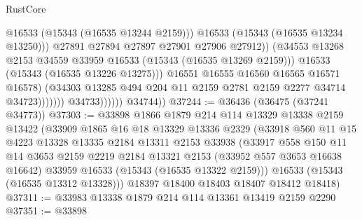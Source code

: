 \begin{lexlean}{RustCore}
\begin{coremodule}
                                            @16533
                                            (@15343 (@16535 @13244 @2159)))
                                          @16533
                                          (@15343 (@16535 @13234 @13250)))
                                        @27891
                                        @27894
                                        @27897
                                        @27901
                                        @27906
                                        @27912))
                                    (@34553
                                      @13268
                                      @2153
                                      @34559
                                      @33959
                                      @16533
                                      (@15343 (@16535 @13269 @2159)))
                                    @16533
                                    (@15343 (@16535 @13226 @13275)))
                                  @16551
                                  @16555
                                  @16560
                                  @16565
                                  @16571
                                  @16578)
                                (@34303
                                  @13285
                                  @494
                                  @204
                                  @11
                                  @2159
                                  @2781
                                  @2159
                                  @2277
                                  @34714
                                  @34723)))))))
                    @34733))))))
        @34744))
@37244 := @36436 (@36475 (@37241 @34773))
@37303 := @33898
    @1866
    @1879
    @214
    @114
    @13329
    @13338
    @2159
    @13422
    (@33909
      @1865
      @16
      @18
      @13329
      @13336
      @2329
      (@33918
        @560
        @11
        @15
        @4223
        @13328
        @13335
        @2184
        @13311
        @2153
        @33938
        (@33917
          @558
          @150
          @11
          @14
          @3653
          @2159
          @2219
          @2184
          @13321
          @2153
          (@33952 @557 @3653 @16638 @16642)
          @33959
          @16533
          (@15343 (@16535 @13322 @2159)))
        @16533
        (@15343 (@16535 @13312 @13328)))
      @18397
      @18400
      @18403
      @18407
      @18412
      @18418)
@37311 := @33983 @13338 @1879 @214 @114 @13361 @13419 @2159 @2290
@37351 := @33898

\end{coremodule}
\end{lexlean}
